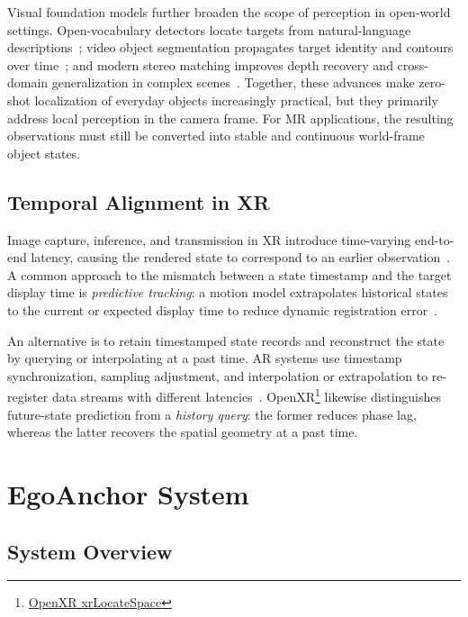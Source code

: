 \documentclass[review]{vgtc}
\begin{document}
Visual foundation models further broaden the scope of perception in open-world settings. Open-vocabulary detectors locate targets from natural-language descriptions~\cite{owlvit2022,glip2022,groundingdino2025,yoloe2025}; video object segmentation propagates target identity and contours over time~\cite{xmem2022,cutie2024}; and modern stereo matching improves depth recovery and cross-domain generalization in complex scenes~\cite{raftstereo2021,igevstereo2023,fastfoundationstereo2026}. Together, these advances make zero-shot localization of everyday objects increasingly practical, but they primarily address local perception in the camera frame. For MR applications, the resulting observations must still be converted into stable and continuous world-frame object states.

\subsection{Temporal Alignment in XR}

Image capture, inference, and transmission in XR introduce time-varying end-to-end latency, causing the rendered state to correspond to an earlier observation~\cite{diluca2010latency,mrloop2022,stauffert2020mtp}. A common approach to the mismatch between a state timestamp and the target display time is \emph{predictive tracking}: a motion model extrapolates historical states to the current or expected display time to reduce dynamic registration error~\cite{azuma1994improving,laviola2003double,pvt2023,yoon2022headmotion}.

An alternative is to retain timestamped state records and reconstruct the state by querying or interpolating at a past time. AR systems use timestamp synchronization, sampling adjustment, and interpolation or extrapolation to re-register data streams with different latencies~\cite{jacobs1997latency}. OpenXR\footnote{\href{https://registry.khronos.org/OpenXR/specs/1.1/man/html/xrLocateSpace.html}{OpenXR xrLocateSpace}} likewise distinguishes future-state prediction from a \emph{history query}: the former reduces phase lag, whereas the latter recovers the spatial geometry at a past time.

\section{EgoAnchor System}\label{sec:system}

\subsection{System Overview}
\end{document}
